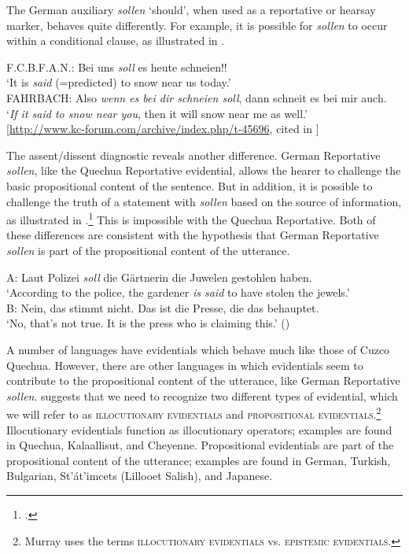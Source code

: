 The German auxiliary \textit{sollen} ‘should’, when used as a reportative or hearsay marker, behaves quite differently. For example, it is possible for \textit{sollen} to occur within a conditional clause, as illustrated in .


\ea \label{ex:17.9}
F.C.B.F.A.N.: Bei uns \textit{soll} es heute schneien!!\\
‘It is \textit{said} (=predicted) to snow near us today.’\\
FAHRBACH: Also \textit{wenn es bei dir schneien soll}, dann schneit es bei mir auch.\\
‘\textit{If it said to snow near you}, then it will snow near me as well.’\\
   {}[\url{http://www.kc-forum.com/archive/index.php/t-45696}, cited in \citealt{Faller2006}]
\z


The assent/dissent diagnostic reveals another difference. German Reportative \textit{sollen}, like the Quechua Reportative evidential, allows the hearer to challenge the basic propositional content of the sentence. But in addition, it is possible to challenge the truth of a statement with \textit{sollen} based on the source of information, as illustrated in .\footnote{\citet{Faller2006}.} This is impossible with the Quechua Reportative. Both of these differences are consistent with the hypothesis that German Reportative \textit{sollen} is part of the propositional content of the utterance.


\ea \label{ex:17.10}
A: Laut Polizei \textit{soll} die Gärtnerin die Juwelen gestohlen haben.\\
\glt   ‘According to the police, the gardener \textit{is said} to have stolen the jewels.’\\
B: Nein, das stimmt nicht. Das ist die Presse, die das behauptet.\\
\glt    ‘No, that’s not true. It is the press who is claiming this.’  (\citealt{Faller2006})
\z


A number of languages have evidentials which behave much like those of Cuzco Quechua. However, there are other languages in which evidentials seem to contribute to the propositional content of the utterance, like German Reportative \textit{sollen}. \citet{Murray2010} suggests that we need to recognize two different types of evidential, which we will refer to as \textsc{illocutionary evidentials} and \textsc{propositional evidentials}.\footnote{Murray uses the terms \textsc{illocutionary evidentials} vs. \textsc{epistemic evidentials}.} Illocutionary evidentials function as illocutionary operators; examples are found in Quechua, Kalaallisut, and Cheyenne. Propositional evidentials are part of the propositional content of the utterance; examples are found in German, Turkish, Bulgarian, St’át’imcets (Lillooet Salish), and Japanese.



